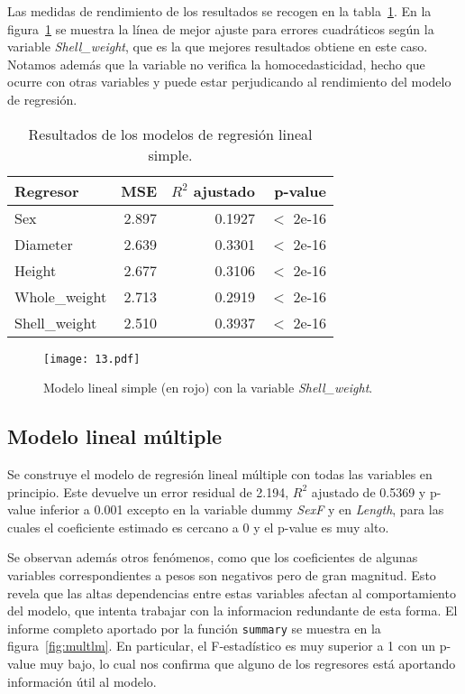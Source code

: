 \documentclass[a4paper, 11pt]{article}
\begin{document}
Las medidas de rendimiento de los resultados se recogen en la tabla~\ref{tbl:lmerr}. En la figura~\ref{fig:lmfit} se muestra la línea de mejor ajuste para errores cuadráticos según la variable \textit{Shell\_weight}, que es la que mejores resultados obtiene en este caso. Notamos además que la variable no verifica la homocedasticidad, hecho que ocurre con otras variables y puede estar perjudicando al rendimiento del modelo de regresión.

\begin{table}[ht]
  \caption{\label{tbl:lmerr}Resultados de los modelos de regresión lineal simple.}
  
  \begin{tabular}[c]{l||r|r|r}
    Regresor & MSE & $R^2$ ajustado & p-value \\
    \hline
    Sex & 2.897 & 0.1927 & $<$ 2e-16  \\
    Diameter & 2.639 & 0.3301 & $<$ 2e-16 \\
    Height & 2.677 & 0.3106 & $<$ 2e-16 \\
    Whole\_weight & 2.713 & 0.2919 & $<$ 2e-16 \\
    Shell\_weight & 2.510 & 0.3937 & $<$ 2e-16
  \end{tabular}
\end{table}


\begin{figure}[ht]
  \texttt{[image: 13.pdf]}
  \caption{\label{fig:lmfit}Modelo lineal simple (en rojo) con la variable \textit{Shell\_weight}.}
\end{figure}

\subsection{Modelo lineal múltiple}

Se construye el modelo de regresión lineal múltiple con todas las variables en principio. Este devuelve un error residual de 2.194, $R^2$ ajustado de 0.5369 y p-value inferior a 0.001 excepto en la variable dummy \textit{SexF} y en \textit{Length}, para las cuales el coeficiente estimado es cercano a 0 y el p-value es muy alto.

Se observan además otros fenómenos, como que los coeficientes de algunas variables correspondientes a pesos son negativos pero de gran magnitud. Esto revela que las altas dependencias entre estas variables afectan al comportamiento del modelo, que intenta trabajar con la informacion redundante de esta forma. El informe completo aportado por la función \texttt{summary} se muestra en la figura~\ref{fig:multlm}. En particular, el F-estadístico es muy superior a 1 con un p-value muy bajo, lo cual nos confirma que alguno de los regresores está aportando información útil al modelo.
\end{document}
